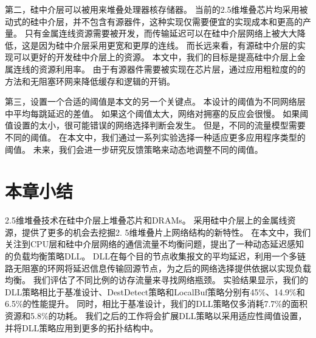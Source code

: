第二，硅中介层可以被用来堆叠处理器核存储器。
当前的2.5维堆叠芯片均采用被动式的硅中介层，并不包含有源器件，这种实现仅需要便宜的实现成本和更高的产量。
只有金属连线资源需要被开发，而传输延迟可以在硅中介层网络上被大大降低，这是因为硅中介层采用更宽和更厚的连线。
而长远来看，有源硅中介层的实现可以更好的开发硅中介层上的资源。
本文中，我们的目标是提高硅中介层上金属连线的资源利用率。
由于有源器件需要被实现在芯片层，通过应用粗粒度的的方法和无阻塞环网来降低缓存和逻辑的开销。

第三，设置一个合适的阈值是本文的另一个关键点。
本设计的阈值为不同网络层中平均每跳延迟的差值。
如果这个阈值太大，网络对拥塞的反应会很慢。
如果阈值设置的太小，很可能错误的网络选择判断会发生。
但是，不同的流量模型需要不同的阈值。
在本文中，我们通过一系列实验选择一种适应更多应用程序类型的阈值。
未来，我们会进一步研究反馈策略来动态地调整不同的阈值。



\section{本章小结}

2.5维堆叠技术在硅中介层上堆叠芯片和DRAMs。
采用硅中介层上的金属线资源，提供了更多的机会去挖掘2. 5维堆叠片上网络结构的新特性。
在本文中，我们关注到CPU层和硅中介层网络的通信流量不均衡问题，提出了一种动态延迟感知的负载均衡策略DLL。
DLL在每个目的节点收集报文的平均延迟，利用一个多链路无阻塞的环网将延迟信息传输回源节点，为之后的网络选择提供依据以实现负载均衡。
我们评估了不同比例的访存流量来寻找网络瓶颈。
实验结果显示，我们的DLL策略相比于基准设计、DestDetect策略和LocalBuf策略分别有45\%、14.9\%和6.5\%的性能提升。
同时，相比于基准设计，我们的DLL策略仅多消耗7.7\%的面积资源和5.8\%的功耗。
我们之后的工作将会扩展DLL策略以采用适应性阈值设置，并将DLL策略应用到更多的拓扑结构中。